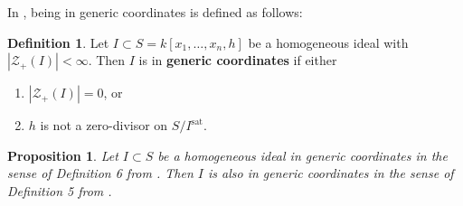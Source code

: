 \documentclass[11pt]{article}
\newcommand{\sat}{^{\text{sat}}}
\newtheorem{proposition}{Proposition}
\theoremstyle{definition}
\newtheorem{definition}{Definition}
\begin{document}
In \cite{caminata2020solving}, being in generic coordinates is defined as follows: 


\begin{definition}
	Let $I \subset S = k[x_1, \dots, x_n, h]$ be a homogeneous ideal with $|\mathcal{Z}_+(I)| < \infty$. Then $I$ is in \textbf{generic coordinates} if either \begin{enumerate}[noitemsep, label = (\roman*)]
		\item $|\mathcal{Z}_+(I)| = 0$, or
		\item $h$ is not a zero-divisor on $S/I\sat$. 
	\end{enumerate}
\end{definition}


\begin{proposition}
	Let $I \subset S$ be a homogeneous ideal in generic coordinates in the sense of Definition 6 from \cite{caminata2020solving}. Then $I$ is also in generic coordinates in the sense of Definition 5 from \cite{bayer1987criterion}. 
\end{proposition}
\end{document}
